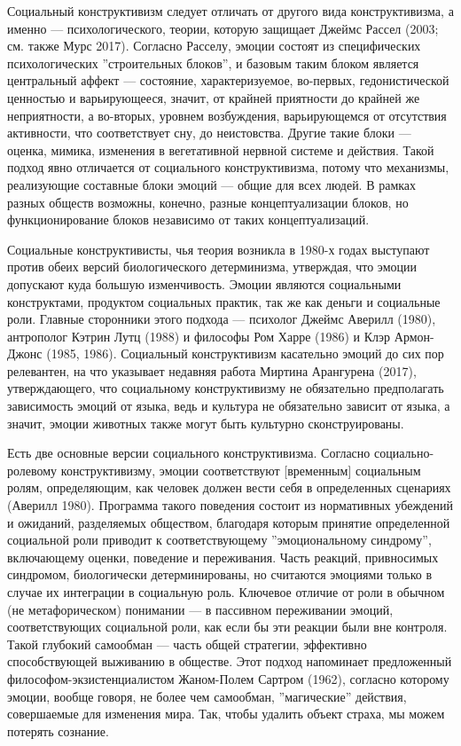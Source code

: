 \documentclass[11pt]{book}
\begin{document}
Социальный конструктивизм следует отличать от другого вида конструктивизма, а именно --- психологического, теории, которую защищает Джеймс Рассел (2003; см. также Мурс 2017). Согласно Расселу, эмоции состоят из специфических психологических ''строительных блоков'', и базовым таким блоком является центральный аффект --- состояние, характеризуемое, во-первых, гедонистической ценностью и варьирующееся, значит, от крайней приятности до крайней же неприятности, а во-вторых, уровнем возбуждения, варьирующемся от отсутствия активности, что соответствует сну, до неистовства. Другие такие блоки --- оценка, мимика, изменения в вегетативной нервной системе и действия. Такой подход явно отличается от социального конструктивизма, потому что механизмы, реализующие составные блоки эмоций --- общие для всех людей. В рамках разных обществ возможны, конечно, разные концептуализации блоков, но функционирование блоков независимо от таких концептуализаций.

Социальные конструктивисты, чья теория возникла в 1980-х годах выступают против обеих версий биологического детерминизма, утверждая, что эмоции допускают куда большую изменчивость. Эмоции являются социальными конструктами, продуктом социальных практик, так же как деньги и социальные роли. Главные сторонники этого подхода --- психолог Джеймс Аверилл (1980), антрополог Кэтрин Лутц (1988) и философы Ром Харре (1986) и Клэр Армон-Джонс (1985, 1986). Социальный конструктивизм касательно эмоций до сих пор релевантен, на что указывает недавняя работа Миртина Арангурена (2017), утверждающего, что социальному конструктивизму не обязательно предполагать зависимость эмоций от языка, ведь и культура не обязательно зависит от языка, а значит, эмоции животных также могут быть культурно сконструированы.

Есть две основные версии социального конструктивизма. Согласно социально-ролевому конструктивизму, эмоции соответствуют [временным] социальным ролям, определяющим, как человек должен вести себя в определенных сценариях (Аверилл 1980). Программа такого поведения состоит из нормативных убеждений и ожиданий, разделяемых обществом, благодаря которым принятие определенной социальной роли приводит к соответствующему ''эмоциональному синдрому'', включающему оценки, поведение и переживания. Часть реакций, привносимых синдромом, биологически детерминированы, но считаются эмоциями только в случае их интеграции в социальную роль. Ключевое отличие от роли в обычном (не метафорическом) понимании --- в пассивном переживании эмоций, соответствующих социальной роли, как если бы эти реакции были вне контроля. Такой глубокий самообман --- часть общей стратегии, эффективно способствующей выживанию в обществе. Этот подход напоминает предложенный философом-экзистенциалистом Жаном-Полем Сартром (1962), согласно которому эмоции, вообще говоря, не более чем самообман, ''магические'' действия, совершаемые для изменения мира. Так, чтобы удалить объект страха, мы можем потерять сознание.
\end{document}

